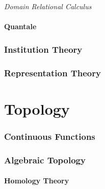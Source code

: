 \documentclass{article}
\begin{document}
\emph{Domain Relational Calculus}

\subsection{Quantale}

\section{Institution Theory}\label{subsec:institution_theory}

\section{Representation Theory}

\part{Topology}\label{sec:topology}

\section{Continuous Functions}\label{sec:continuous_functions}

\section{Algebraic Topology}\label{sec:algebraic_topology}

\subsection{Homology Theory}\label{subsec:homology_theory}
\end{document}
